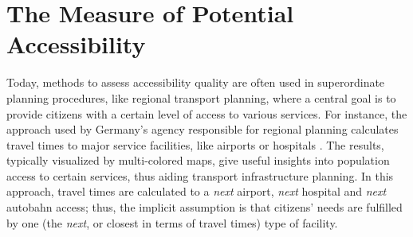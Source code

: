 \section{The Measure of Potential Accessibility}
\label{sec:potential}
Today, methods to assess accessibility quality are often used in superordinate planning procedures, like 
regional transport planning, where a central goal is to provide citizens with a certain level of access to
various services. For instance, the approach used by Germany's agency responsible for regional planning calculates
travel times to major service facilities, like airports or hospitals \citep{BBSRErreichbarkeitsmodell}. The results,
typically visualized by multi-colored maps, give useful insights 
into population access to certain services, thus aiding transport 
infrastructure planning.
In this approach, travel times are calculated to a \emph{next} airport, \emph{next} hospital and
 \emph{next} autobahn access; thus, the implicit assumption is that citizens' needs are fulfilled by
one (\ie the \emph{next}, or closest in terms of travel times) type of facility.


